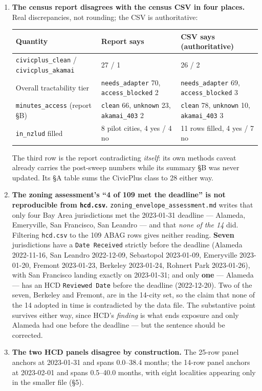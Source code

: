 \documentclass[11pt]{article}
\begin{document}
\begin{enumerate}
\item \textbf{The census report disagrees with the census CSV in four places.} Real discrepancies,
not rounding; the CSV is authoritative:

\begin{center}
\small
\begin{tabular}{p{} p{} p{}}
\toprule
\textbf{Quantity} & \textbf{Report says} & \textbf{CSV says (authoritative)} \\
\midrule
\texttt{civicplus\_clean} / \texttt{civicplus\_akamai} & 27 / 1 & 26 / 2 \\
Overall tractability tier & \texttt{needs\_adapter} 70, \texttt{access\_blocked} 2 &
\texttt{needs\_adapter} 69, \texttt{access\_blocked} 3 \\
\texttt{minutes\_access} (report \S B) & \texttt{clean} 66, \texttt{unknown} 23,
\texttt{akamai\_403} 2 & \texttt{clean} 78, \texttt{unknown} 10, \texttt{akamai\_403} 3 \\
\texttt{in\_nzlud} filled & 8 pilot cities, 4 yes / 4 no & 11 rows filled, 4 yes / 7 no \\
\bottomrule
\end{tabular}
\end{center}

The third row is the report contradicting \emph{itself}: its own methods caveat already carries
the post-sweep numbers while its summary \S B was never updated. Its \S A table sums the
CivicPlus class to 28 either way.

\item \textbf{The zoning assessment's ``4 of 109 met the deadline'' is not reproducible from
\texttt{hcd.csv}.} \texttt{zoning\_envelope\_assessment.md} writes that only four Bay Area
jurisdictions met the 2023-01-31 deadline --- Alameda, Emeryville, San Francisco, San Leandro ---
and that \emph{none of the 14} did. Filtering \texttt{hcd.csv} to the 109 ABAG rows gives neither
reading. \textbf{Seven} jurisdictions have a \texttt{Date Received} strictly before the deadline
(Alameda 2022-11-16, San Leandro 2022-12-09, Sebastopol 2023-01-09, Emeryville 2023-01-20,
Fremont 2023-01-23, Berkeley 2023-01-24, Rohnert Park 2023-01-26), with San Francisco landing
exactly on 2023-01-31; and only \textbf{one} --- Alameda --- has an HCD \texttt{Reviewed Date}
before the deadline (2022-12-20). Two of the seven, Berkeley and Fremont, are in the 14-city set,
so the claim that none of the 14 adopted in time is contradicted by the data file. The
substantive point survives either way, since HCD's \emph{finding} is what ends exposure and only
Alameda had one before the deadline --- but the sentence should be corrected.

\item \textbf{The two HCD panels disagree by construction.} The 25-row panel anchors at
2023-01-31 and spans 0.0--38.4 months; the 14-row panel anchors at 2023-02-01 and spans
0.5--40.0 months, with eight localities appearing only in the smaller file (\S5).

\end{enumerate}
\end{document}
